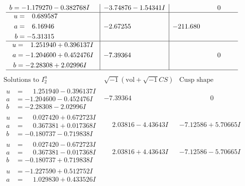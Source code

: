\documentclass[1p]{elsarticle_modified}
\theoremstyle{definition}
\newcommand{\I}{\sqrt{-1}}
\begin{document}
$$\begin{array}{c|c|c}
\begin{aligned}
b &= -1.179270 - 0.382768 I\end{aligned}
 & -3.74876 - 1.54341 I & \phantom{-0.000000 } 0 \\ \hline\begin{aligned}
u &= \phantom{-}0.689587\phantom{ +0.000000I} \\
a &= \phantom{-}6.16946\phantom{ +0.000000I} \\
b &= -5.31315\phantom{ +0.000000I}\end{aligned}
 & -2.67255\phantom{ +0.000000I} & -211.680\phantom{ +0.000000I} \\ \hline\begin{aligned}
u &= \phantom{-}1.251940 + 0.396137 I \\
a &= -1.204600 + 0.452476 I \\
b &= -2.28308 + 2.02996 I\end{aligned}
 & -7.39364\phantom{ +0.000000I} & \phantom{-0.000000 } 0\\
 \hline 
 \end{array}$$\newpage$$\begin{array}{c|c|c}  
\text{Solutions to }I^u_{2}& \I (\text{vol} + \sqrt{-1}CS) & \text{Cusp shape}\\
 \hline 
\begin{aligned}
u &= \phantom{-}1.251940 - 0.396137 I \\
a &= -1.204600 - 0.452476 I \\
b &= -2.28308 - 2.02996 I\end{aligned}
 & -7.39364\phantom{ +0.000000I} & \phantom{-0.000000 } 0 \\ \hline\begin{aligned}
u &= \phantom{-}0.027420 + 0.672723 I \\
a &= \phantom{-}0.367381 + 0.017368 I \\
b &= -0.180737 - 0.719838 I\end{aligned}
 & \phantom{-}2.03816 - 4.43643 I & -7.12586 + 5.70665 I \\ \hline\begin{aligned}
u &= \phantom{-}0.027420 - 0.672723 I \\
a &= \phantom{-}0.367381 - 0.017368 I \\
b &= -0.180737 + 0.719838 I\end{aligned}
 & \phantom{-}2.03816 + 4.43643 I & -7.12586 - 5.70665 I \\ \hline\begin{aligned}
u &= -1.227590 + 0.512752 I \\
a &= \phantom{-}1.029830 + 0.433526 I \\

\end{aligned}
\end{array}$$
\end{document}
